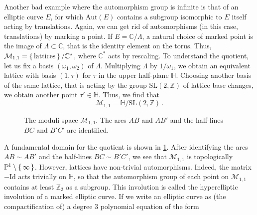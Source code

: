 \documentclass[11pt,reqno]{amsart}
\numberwithin{equation}{section}
\newcommand{\Id}{\mathrm{Id}}
\newcommand{\Aut}{\mathrm{Aut}}
\newcommand{\mb}[1]{\mathbb{#1}}
\newcommand{\mc}[1]{\mathcal{#1}}
\newcommand{\mr}[1]{\mathrm{#1}}
\newcommand{\Z}{\mb{Z}}
\newcommand{\C}{\mb{C}}
\renewcommand{\P}{\mb{P}}
\renewcommand{\H}{\mb{H}}
\newcommand{\M}{\mc{M}}
\theoremstyle{plain}
\theoremstyle{definition}
\begin{document}
Another bad example where the automorphism group is infinite is that of an elliptic curve $E$, for which $\Aut(E)$ contains a subgroup isomorphic to $E$ itself acting by translations. Again, we can get rid of automorphisms (in this case, translations) by marking a point. If $E = \C/\Lambda$, a natural choice of marked point is the image of $\Lambda \subset \C$, that is the identity element on the torus. Thus, $\M_{1,1} = \set{\text{lattices}} / \C^*$, where $\C^*$ acts by rescaling. To understand the quotient, let us fix a basis $(\omega_1, \omega_2)$ of $\Lambda$. Multiplying $\Lambda$ by $1/\omega_1$, we obtain an equivalent lattice with basis $(1,\tau)$ for $\tau$ in the upper half-plane $\H$. Choosing another basis of the same lattice, that is acting by the group $\mr{SL}(2,\Z)$ of lattice base changes, we obtain another point $\tau' \in \H$. Thus, we find that
\begin{equation}
  \M_{1,1} = \H / \mr{SL}(2,\Z) \,.
\end{equation}
%
\begin{figure}[t]
  \centering
  \tikzset{every picture/.style=thick}
  \caption{The moduli space $\M_{1,1}$. The arcs $AB$ and $AB'$ and the half-lines $BC$ and $B'C'$ are identified.}
  \label{fig:M11}
\end{figure}
%
A fundamental domain for the quotient is shown in \cref{fig:M11}. After identifying the arcs $AB \sim AB'$ and the half-lines $BC \sim B'C'$, we see that $\M_{1,1}$ is topologically $\P^1 \setminus \set{\infty}$. However, lattices have non-trivial automorphisms. Indeed, the matrix $-\Id$ acts trivially on $\H$, so that the automorphism group of each point on $\M_{1,1}$ contains at least $\Z_{2}$ as a subgroup. This involution is called the hyperelliptic involution of a marked elliptic curve. If we write an elliptic curve as (the compactification of) a degree $3$ polynomial equation of the form
\end{document}
